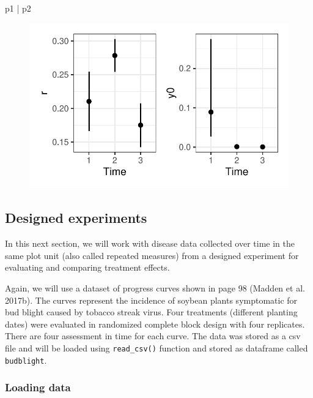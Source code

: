 \documentclass[
  letterpaper,
  DIV=11,
  numbers=noendperiod]{scrreprt}
\newenvironment{Shaded}{\begin{snugshade}}{\end{snugshade}}
\newcommand{\NormalTok}[1]{\textcolor[rgb]{0.00,0.23,0.31}{#1}}
\newcommand{\SpecialCharTok}[1]{\textcolor[rgb]{0.37,0.37,0.37}{#1}}
\begin{document}
\begin{Shaded}
\begin{Highlighting}[]
\NormalTok{p1 }\SpecialCharTok{|}\NormalTok{ p2}
\end{Highlighting}
\end{Shaded}

\begin{figure}[H]

{\centering \includegraphics{./temporal-fitting_files/figure-pdf/unnamed-chunk-26-1.pdf}

}

\end{figure}

\hypertarget{designed-experiments}{%
\subsection{Designed experiments}\label{designed-experiments}}

In this next section, we will work with disease data collected over time
in the same plot unit (also called repeated measures) from a designed
experiment for evaluating and comparing treatment effects.

Again, we will use a dataset of progress curves shown in page 98 (Madden
et al. 2017b). The curves represent the incidence of soybean plants
symptomatic for bud blight caused by tobacco streak virus. Four
treatments (different planting dates) were evaluated in randomized
complete block design with four replicates. There are four assessment in
time for each curve. The data was stored as a csv file and will be
loaded using \texttt{read\_csv()} function and stored as dataframe
called \texttt{budblight}.

\hypertarget{loading-data}{%
\subsubsection{Loading data}\label{loading-data}}
\end{document}
